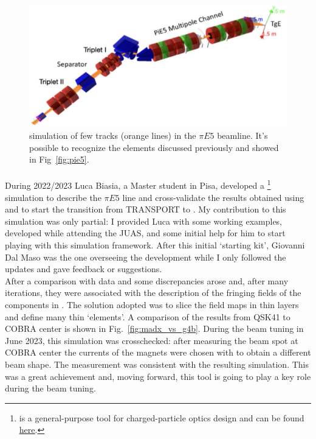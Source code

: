 \begin{refsection}
        \begin{figure}
            \centering
            \includegraphics[width = \textwidth]{Figures/MEG/piE5_gfb.png}
            \caption[$\pi E5$: \gfb simulation]{\gfb simulation of few tracks (orange lines) in the $\pi E5$ beamline. It's possible to recognize the elements discussed previously and showed in Fig~\ref{fig:pie5}.}
            \label{fig:piE5_gfb}
        \end{figure}
        
        \paragraph{\madx} During 2022/2023 Luca Biasia, a Master student in Pisa, developed a \madx\footnote{\madx is a general-purpose tool for charged-particle optics design and can be found \href{http://madx.web.cern.ch/madx/}{\underline{here}}.} simulation to describe the $\pi E5$ line and cross-validate the results obtained using \gfb and to start the transition from TRANSPORT to \madx.        
        My contribution to this simulation was only partial: I provided Luca with some working \madx examples, developed while attending the JUAS, and some initial help for him to start playing with this simulation framework. 
        After this initial `starting kit', Giovanni Dal Maso was the one overseeing the development while I only followed the updates and gave feedback or suggestions. \\
        After a comparison with data and \gfb some discrepancies arose and, after many iterations, they were associated with the description of the fringing fields of the components in \madx. 
        The solution adopted was to slice the field maps in thin layers and define many thin `\madx elements'. 
        A comparison of the results from QSK41 to COBRA center is shown in Fig.~\ref{fig:madx_vs_g4b}.
        During the beam tuning in June 2023, this simulation was crosschecked: after measuring the beam spot at COBRA center the currents of the magnets were chosen with \madx to obtain a different beam shape. 
        The measurement was consistent with the resulting simulation.
        This was a great achievement and, moving forward, this tool is going to play a key role during the beam tuning.


\end{refsection}
